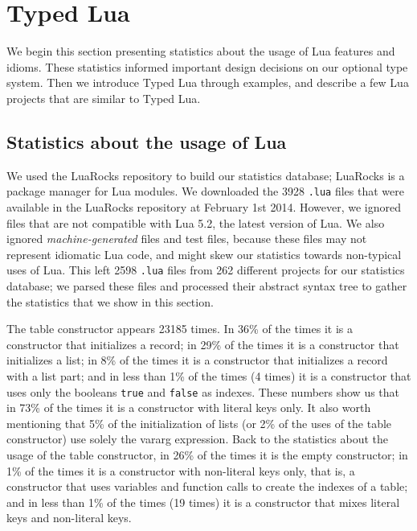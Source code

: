 \documentclass[preprint]{sig-alternate}
\begin{document}
\section{Typed Lua} \label{sec:proposal}

We begin this section presenting statistics about the usage of Lua
features and idioms.
These statistics informed important design decisions on our optional
type system.
Then we introduce Typed Lua through examples, and describe a few Lua
projects that are similar to Typed Lua. 

\subsection{Statistics about the usage of Lua}

We used the LuaRocks repository to build our statistics database;
LuaRocks \cite{hisham2013luarocks} is a package manager for Lua
modules.
We downloaded the 3928 \verb'.lua' files that were available in
the LuaRocks repository at February 1st 2014.
However, we ignored files that are not compatible with Lua 5.2,
the latest version of Lua.
We also ignored \textit{machine-generated} files and test files,
because these files may not represent idiomatic Lua code,
and might skew our statistics towards non-typical uses of Lua.
This left 2598 \verb'.lua' files from 262 different projects for
our statistics database;
we parsed these files and processed their abstract syntax tree
to gather the statistics that we show in this section.

The table constructor appears 23185 times.
In 36\% of the times it is a constructor that initializes a record;
in 29\% of the times it is a constructor that initializes a list;
in 8\% of the times it is a constructor that initializes a record
with a list part;
and in less than 1\% of the times (4 times) it is a constructor
that uses only the booleans \verb'true' and \verb'false' as indexes.
These numbers show us that in 73\% of the times it is a constructor
with literal keys only.
It also worth mentioning that 5\% of the initialization of lists
(or 2\% of the uses of the table constructor) use solely the vararg
expression.
Back to the statistics about the usage of the table constructor,
in 26\% of the times it is the empty constructor;
in 1\% of the times it is a constructor with non-literal keys
only, that is, a constructor that uses variables and function calls
to create the indexes of a table;
and in less than 1\% of the times (19 times) it is a constructor that
mixes literal keys and non-literal keys.
\end{document}
